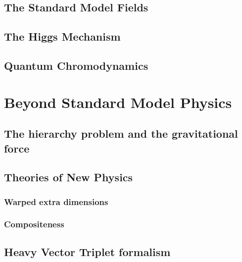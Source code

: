 \subsection{The Standard Model Fields}
\label{sec:theory:ew}
\subsection{The Higgs Mechanism}
\subsection{Quantum Chromodynamics}
\label{sec:theory:qcd}
\section{Beyond Standard Model Physics}
\subsection{The hierarchy problem and the gravitational force}
\subsection{Theories of New Physics}
\subsubsection{Warped extra dimensions}
\label{sec:theory:wed}
\subsubsection{Compositeness}
\subsection{Heavy Vector Triplet formalism}
\label{sec:theory:hvt}
	